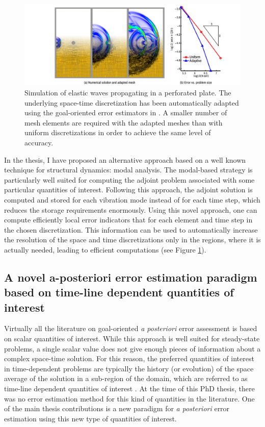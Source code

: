 \documentclass{article}
\begin{document}
\begin{figure}[ht!]
\includegraphics[width=\textwidth]{../_assets/fig17.png}
\caption{Simulation of elastic waves propagating in a perforated plate. The underlying space-time discretization has been automatically adapted using the goal-oriented error estimators in \cite{verdugo_2013}. A smaller number of mesh elements are required with the adapted meshes than with uniform discretizations in order to achieve the same level of accuracy. }
\label{fig:amr-phd}
\end{figure}

In the thesis, I have proposed an alternative approach based on a well known technique for structural dynamics: modal analysis. The modal-based strategy is particularly well suited for computing the adjoint problem associated with some particular quantities of interest. Following this approach, the adjoint solution is computed and stored for each vibration mode instead of for each time step, which reduces the storage requirements enormously. Using this novel approach, one can compute efficiently local error indicators that for each element and time step in the chosen discretization. This information can be used to automatically increase the resolution of the space and time discretizations only in the regions, where it is actually needed, leading to efficient computations (see Figure \ref{fig:amr-phd}). 


\subsection{A novel a-posteriori error estimation paradigm based on time-line dependent quantities of interest}

Virtually all the literature on goal-oriented \emph{a posteriori} error assessment is based on scalar quantities of interest. While this approach is well suited for steady-state problems, a single scalar value does not give enough pieces of information about a complex space-time solution. For this reason, the preferred quantities of interest in time-dependent problems are typically the history (or evolution) of the space average of the solution in a sub-region of the domain, which are referred to as time-line dependent quantities of interest \cite{verdugo_2013}. At the time of this PhD thesis, there was no error estimation method for this kind of quantities in the literature. One of the main thesis contributions is a new paradigm for \emph{a posteriori} error estimation using this new type of quantities of interest.
\end{document}
